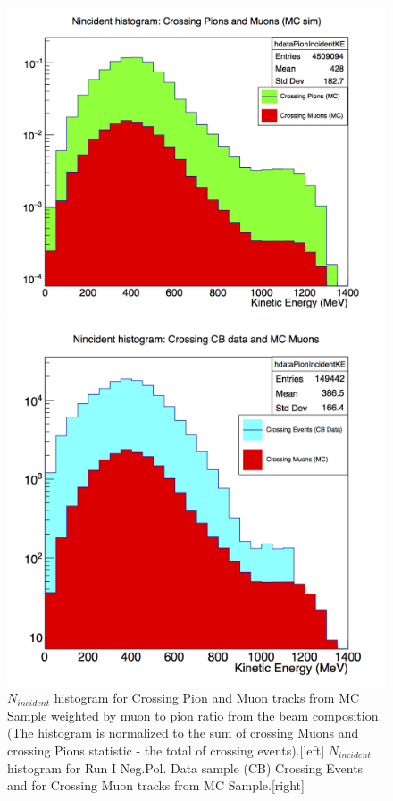 \begin{figure}[h!]
\begin{minipage}{0.5\textwidth}
\includegraphics[width=\textwidth]{./images/CrossingPiMu.png}
\end{minipage}
\begin{minipage}{0.5\textwidth}
\includegraphics[width=\textwidth]{./images/CrossingCBandMuMC.png}
\end{minipage}
\caption{$N_{incident}$ histogram for Crossing Pion and Muon tracks from MC Sample weighted by muon to pion ratio from the beam composition. (The histogram is normalized to the sum of crossing Muons and crossing Pions statistic - the total of crossing events).[left] $N_{incident}$ histogram for Run I Neg.Pol. Data sample (CB) Crossing Events and for Crossing Muon tracks from MC Sample.[right]}
\label{CrossingMCNinc}
\end{figure}

